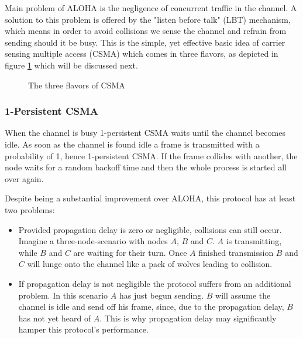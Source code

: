 Main problem of ALOHA is the negligence of concurrent traffic in the channel. A solution to this problem is offered by the "listen before talk" (LBT) mechanism, which means in order to avoid collisions we sense the channel and refrain from sending should it be busy. This is the simple, yet effective basic idea of carrier sensing multiple access (CSMA) which comes in three flavors, as depicted in figure \ref{fig:csma-flavors} which will be discussed next.

\begin{figure}[tb] \label{fig:csma-flavors}
	\begin{center}
		\qquad
		\qquad
	\end{center}
\caption{The three flavors of CSMA}
\end{figure}


\subsubsection{1-Persistent CSMA}

When the channel is busy 1-persistent CSMA waits until the channel becomes idle. As soon as the channel is found idle a frame is transmitted with a probability of 1, hence 1-persistent CSMA. If the frame collides with another, the node waits for a random backoff time and then the whole process is started all over again.

Despite being a substantial improvement over ALOHA, this protocol has at least two problems:

\begin{itemize}
	\item Provided propagation delay is zero or negligible, collisions can still occur.  Imagine a three-node-scenario with nodes $A$, $B$ and $C$. $A$ is transmitting, while $B$ and $C$ are waiting for their turn. Once $A$ finished transmission $B$ and $C$ will lunge onto the channel like a pack of wolves leading to collision.
	
	\item If propagation delay is not negligible the protocol suffers from an additional problem. In this scenario $A$ has just begun sending. $B$ will assume the channel is idle and send off his frame, since, due to the propagation delay, $B$ has not yet heard of $A$. This is why propagation delay may significantly hamper this protocol's performance.
\end{itemize}  

